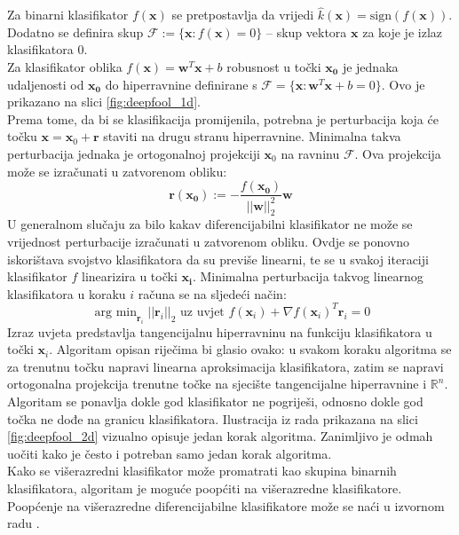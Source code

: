 \documentclass[utf8, diplomski]{fer}
\begin{document}
Za binarni klasifikator $f(\boldsymbol{x})$ se pretpostavlja da vrijedi $\hat{k}(\boldsymbol{x}) = \text{sign}(f(\boldsymbol{x}))$. Dodatno se definira skup $\mathscr{F} := \{\boldsymbol{x} : f(\boldsymbol{x}) = 0\}$ -- skup vektora $\boldsymbol{x}$ za koje je izlaz klasifikatora $0$. \\
Za klasifikator oblika $f(\boldsymbol{x}) = \boldsymbol{w}^{T}\boldsymbol{x} + b$ robusnost u točki $\boldsymbol{x_{0}}$ je jednaka udaljenosti od $\boldsymbol{x_{0}}$ do hiperravnine definirane s $\mathscr{F} = \{\boldsymbol{x} : \boldsymbol{w}^{T}\boldsymbol{x}+b=0\}$. Ovo je prikazano na slici \ref{fig:deepfool_1d}. \\
Prema tome, da bi se klasifikacija promijenila, potrebna je perturbacija koja će točku $\boldsymbol{x} = \boldsymbol{x}_{0} + \boldsymbol{r}$ staviti na drugu stranu hiperravnine. Minimalna takva perturbacija jednaka je ortogonalnoj projekciji $\boldsymbol{x}_{0}$ na ravninu $\mathscr{F}$. Ova projekcija može se izračunati u zatvorenom obliku:
\begin{equation}
	\boldsymbol{r}(\boldsymbol{x_{0}}) := - \frac{f(\boldsymbol{x_{0}})}{||\boldsymbol{w}||_{2}^{2}}\boldsymbol{w}
\end{equation}
U generalnom slučaju za bilo kakav diferencijabilni klasifikator ne može se vrijednost perturbacije izračunati u zatvorenom obliku. Ovdje se ponovno iskorištava svojstvo klasifikatora da su previše linearni, te se u svakoj iteraciji klasifikator $f$ linearizira u točki $\boldsymbol{x_{i}}$. Minimalna perturbacija takvog linearnog klasifikatora u koraku $i$ računa se na sljedeći način:
\begin{equation}
	\mathop{\text{arg min}}_{\boldsymbol{r}_{i}}||\boldsymbol{r}_{i}||_{2} \text{ uz uvjet } f(\boldsymbol{x}_{i}) + \nabla f(\boldsymbol{x}_{i})^{T}\boldsymbol{r}_{i} = 0
\end{equation}
Izraz uvjeta predstavlja tangencijalnu hiperravninu na funkciju klasifikatora u točki $\boldsymbol{x}_{i}$. Algoritam opisan riječima bi glasio ovako: u svakom koraku algoritma se za trenutnu točku napravi linearna aproksimacija klasifikatora, zatim se napravi ortogonalna projekcija trenutne točke na sjecište tangencijalne hiperravnine i $\mathbb{R}^{n}$. Algoritam se ponavlja dokle god klasifikator ne pogriješi, odnosno dokle god točka ne dođe na granicu klasifikatora. Ilustracija iz rada prikazana na slici \ref{fig:deepfool_2d} vizualno opisuje jedan korak algoritma. Zanimljivo je odmah uočiti kako je često i potreban samo jedan korak algoritma. \\
Kako se višerazredni klasifikator može promatrati kao skupina binarnih klasifikatora, algoritam je moguće poopćiti na višerazredne klasifikatore. Poopćenje na višerazredne diferencijabilne klasifikatore može se naći u izvornom radu \citep{MoosaviDezfooli2016DeepFoolAS}. \\
\end{document}
